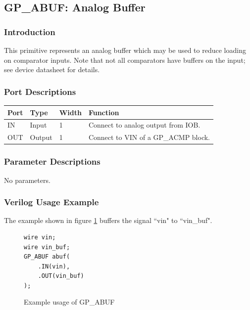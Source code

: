 \documentclass{article}
\begin{document}

\pagebreak
\subsection{GP\_ABUF: Analog Buffer}

\subsubsection{Introduction}
This primitive represents an analog buffer which may be used to reduce loading on comparator inputs. Note that not all 
comparators have buffers on the input; see device datasheet for details.

\subsubsection{Port Descriptions}

\begin{tabularx}{5in}{|l|l|l|X|}
\hline
{\bfseries Port} & {\bfseries Type} & {\bfseries Width} & {\bfseries Function} \\
\hline
IN & Input & 1 & Connect to analog output from IOB.\\
\hline
OUT & Output & 1 & Connect to VIN of a GP\_ACMP block.\\
\hline
\end{tabularx}

\subsubsection{Parameter Descriptions}

No parameters.

\subsubsection{Verilog Usage Example}

The example shown in figure \ref{gp-abuf-example} buffers the signal ``vin" to ``vin\_buf".

\begin{figure}[h]
\begin{lstlisting}
wire vin;
wire vin_buf;
GP_ABUF abuf(
	.IN(vin),
	.OUT(vin_buf)
);
\end{lstlisting}
\caption{Example usage of GP\_ABUF}
\label{gp-abuf-example}
\end{figure}
\end{document}

